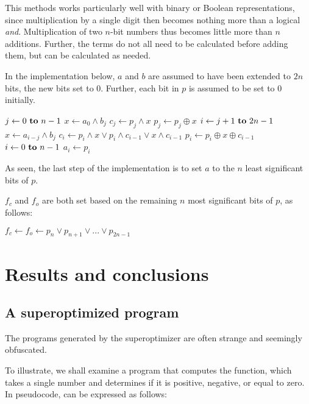 \documentclass[a4paper,11pt]{kth-mag}
\renewcommand{\gets}{\leftarrow}
\newcommand{\AND}{\land}
\newcommand{\IOR}{\lor}
\newcommand{\XOR}{\oplus}
\begin{document}
This methods works particularly well with binary or Boolean representations, since multiplication by a single digit then becomes nothing more than a logical \emph{and}.
Multiplication of two $n$-bit numbers thus becomes little more than $n$ additions.
Further, the terms do not all need to be calculated before adding them, but can be calculated as needed.

In the implementation below, $a$ and $b$ are assumed to have been extended to $2n$ bits, the new bits set to 0.
Further, each bit in $p$ is assumed to be set to 0 initially.


\begin{codebox}
\zi \For $j \gets 0 \To n-1$ \Do
\zi   $x \gets a_{0} \AND b_{j}$
\zi   $c_{j} \gets p_{j} \AND x$
\zi   $p_{j} \gets p_{j} \XOR x$
\zi   \For $i \gets j+1 \To 2n-1$ \Do
\zi     $x \gets a_{i-j} \AND b_{j}$
\zi     $c_{i} \gets p_{i} \AND x \IOR p_{i} \AND c_{i-1} \IOR x \AND c_{i-1}$
\zi     $p_{i} \gets p_{i} \XOR x \XOR c_{i-1}$ \End \End
\zi \For $i \gets 0 \To n-1$ \Do
\zi   $a_{i} \gets p_{i}$ \End
\end{codebox}

As seen, the last step of the implementation is to set $a$ to the $n$ least significant bits of $p$.

$f_c$ and $f_o$ are both set based on the remaining $n$ most significant bits of $p$, as follows:

\begin{codebox}
\zi $f_c \gets f_o \gets p_{n} \IOR p_{n+1} \IOR ... \IOR p_{2n-1}$
\end{codebox}

\chapter{Results and conclusions}
\label{ch:results_conclusions}

\section{A superoptimized program}

The programs generated by the superoptimizer are often strange and seemingly obfuscated.

To illustrate, we shall examine a program that computes the  function, which takes a single number and determines if it is positive, negative, or equal to zero. %
In pseudocode,  can be expressed as follows:
\end{document}
